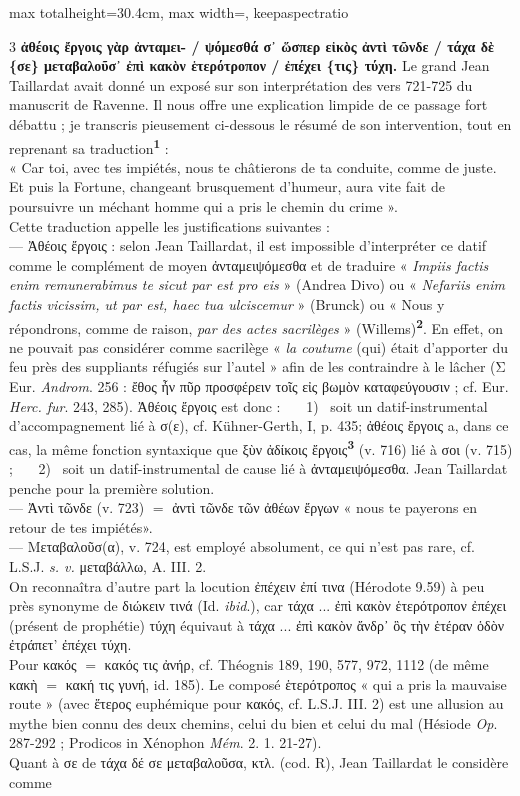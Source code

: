 \documentclass[11pt,twoside]{book}
\newcommand{\italique}[1]{\textit{#1}}
\newcommand{\latin}[1]{\textit{#1}}
\newcommand{\marqueur}[1]{\textsuperscript{\color{rubricRed}\textbf{#1}}}
\begin{document}
\begin{adjustbox}{max totalheight=30.4cm, max width=\textwidth, keepaspectratio}
\begin{minipage}{\textwidth}
{\begin{multicols}{3}
 \textbf{ἀθέοις ἔργοις γὰρ ἀνταμει- / ψόμεσθά σ᾽ ὥσπερ εἰκὸς ἀντὶ τῶνδε / τάχα δὲ \{σε\} μεταβαλοῦσ᾽ ἐπὶ κακὸν ἑτερότροπον / ἐπέχει \{τις\} τύχη.} Le grand Jean Taillardat avait donné un exposé sur son interprétation des vers 721-725 du manuscrit de Ravenne. Il nous offre une explication limpide de ce passage fort débattu ; je transcris pieusement ci-dessous le résumé de son intervention, tout en reprenant sa traduction\marqueur{1} : \\ « Car toi, avec tes impiétés, nous te châtierons de ta conduite, comme de juste. Et puis la Fortune, changeant brusquement d'humeur, aura vite fait de poursuivre un méchant homme qui a pris le chemin du crime ».\\ Cette traduction appelle les justifications suivantes : \\ — Ἀθέοις ἔργοις : selon Jean Taillardat, il est impossible d'interpréter ce datif comme le complément de moyen ἀνταμειψόμεσθα et de traduire « \latin{\italique{Impiis factis} enim remunerabimus te sicut par est pro eis} » (Andrea Divo) ou « \latin{\italique{Nefariis} enim \italique{factis} vicissim, ut par est, haec tua ulciscemur} » (Brunck) ou « Nous y répondrons, comme de raison, \italique{par des actes sacrilèges} » (Willems)\marqueur{2}. En effet, on ne pouvait pas considérer comme sacrilège « \italique{la coutume} (qui) était d'apporter du feu près des suppliants réfugiés sur l'autel » afin de les contraindre à le lâcher (Σ Eur. \italique{Androm}. 256 : ἔθος ἦν πῦρ προσφέρειν τοῖς εἰς βωμὸν καταφεύγουσιν ; cf. Eur. \italique{Herc. fur}. 243, 285). Ἀθέοις ἔργοις est donc : \ \ \ 1) \ soit un datif-instrumental d'accompagnement lié à σ(ε), cf. Kühner-Gerth, I, p. 435; ἀθέοις ἔργοις a, dans ce cas, la même fonction syntaxique que ξὺν ἀδίκοις ἔργοις\marqueur{3} (v. 716) lié à σοι (v. 715) ; \ \ \ 2) \ soit un datif-instrumental de cause lié à ἀνταμειψόμεσθα. Jean Taillardat penche pour la première solution.\\ — Ἀντὶ τῶνδε (v. 723) $=$ ἀντὶ τῶνδε τῶν ἀθέων ἔργων « nous te payerons en retour de tes impiétés».\\ — Μεταβαλοῦσ(α), v. 724, est employé absolument, ce qui n'est pas rare, cf. L.S.J. \italique{s. v.} μεταβάλλω, A. III. 2.\\ On reconnaîtra d'autre part la locution ἐπέχειν ἐπί τινα (Hérodote 9.59) à peu près synonyme de διώκειν τινά (Id. \italique{ibid}.), car τάχα ... ἐπὶ κακὸν ἑτερότροπον ἐπέχει (présent de prophétie) τύχη équivaut à τάχα ... ἐπὶ κακὸν ἄνδρ᾽ ὃς τὴν ἑτέραν ὁδὸν ἐτράπετ' ἐπέχει τύχη.\\ Pour κακός $=$ κακός τις ἀνήρ, cf. Théognis 189, 190, 577, 972, 1112 (de même κακὴ $=$ κακή τις γυνή, id. 185). Le composé ἑτερότροπος « qui a pris la mauvaise route » (avec ἕτερος euphémique pour κακός, cf. L.S.J. III. 2) est une allusion au mythe bien connu des deux chemins, celui du bien et celui du mal (Hésiode \italique{Op}. 287-292 ; Prodicos in Xénophon \italique{Mém}. 2. 1. 21-27). \\ Quant à σε de τάχα δέ σε μεταβαλοῦσα, κτλ. (cod. R), Jean Taillardat le considère comme 
\end{multicols}}
\end{minipage}
\end{adjustbox}
\end{document}
